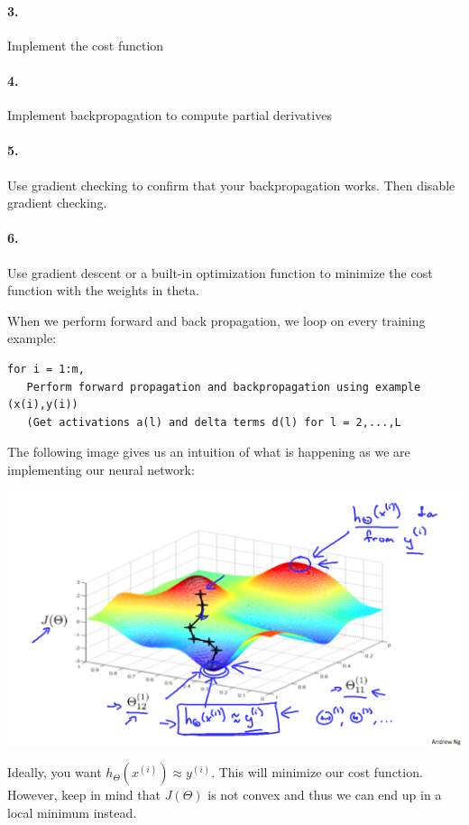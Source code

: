 \documentclass[UTF8]{article}
\begin{document}
\paragraph{3.} Implement the cost function
\paragraph{4.} Implement backpropagation to compute partial derivatives
\paragraph{5.} Use gradient checking to confirm that your backpropagation works. Then disable gradient checking.
\paragraph{6.} Use gradient descent or a built-in optimization function to minimize the cost function with the weights in theta.

When we perform forward and back propagation, we loop on every training example:

\begin{lstlisting}
for i = 1:m,
   Perform forward propagation and backpropagation using example (x(i),y(i))
   (Get activations a(l) and delta terms d(l) for l = 2,...,L
\end{lstlisting}   

The following image gives us an intuition of what is happening as we are implementing our neural network:

\includegraphics[width = .8\textwidth]{NotePics/9_7_1.png}

Ideally, you want $h_\Theta(x^{(i)}) \approx y^{(i)}$. This will minimize our cost function. However, keep in mind that $J(\Theta)$ is not convex and thus we can end up in a local minimum instead.
\end{document}
